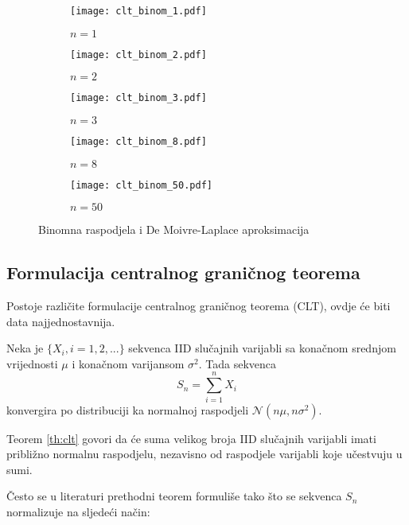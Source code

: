 \begin{figure}[H]
  \centering
  \begin{subfigure}[b]{0.3\textwidth}
    \centering
    \texttt{[image: clt\_binom\_1.pdf]}
    \caption{$n=1$}
    \label{fig:binom:a}
  \end{subfigure}
  \vspace{10pt}
	\begin{subfigure}[b]{0.3\textwidth}
		\centering
    \texttt{[image: clt\_binom\_2.pdf]}
    \caption{$n=2$}
    \label{fig:binom:b}
	\end{subfigure}
	\begin{subfigure}[b]{0.3\textwidth}
		\centering
    \texttt{[image: clt\_binom\_3.pdf]}
    \caption{$n=3$}
    \label{fig:binom:c}
	\end{subfigure}
	\begin{subfigure}[b]{0.3\textwidth}
		\centering
    \texttt{[image: clt\_binom\_8.pdf]}
    \caption{$n=8$}
    \label{fig:binom:d}
	\end{subfigure}
	\begin{subfigure}[b]{0.3\textwidth}
		\centering
    \texttt{[image: clt\_binom\_50.pdf]}
    \caption{$n=50$}
    \label{fig:binom:e}
	\end{subfigure}
	\caption{Binomna raspodjela i De Moivre-Laplace aproksimacija}
  \label{fig:binom}
\end{figure}

\subsection{Formulacija centralnog graničnog teorema}

Postoje različite formulacije centralnog graničnog teorema (CLT), ovdje će biti
data najjednostavnija.

\begin{theorem} \label{th:clt}
  Neka je $\{X_i, i=1,2,...\}$ sekvenca IID slučajnih varijabli sa
  konačnom srednjom vrijednosti $\mu$ i konačnom varijansom $\sigma^2$. Tada
  sekvenca $$S_n = \sum_{i=1}^{n} X_i$$ konvergira po distribuciji ka normalnoj
  raspodjeli $\mathcal{N}(n\mu, n\sigma^2)$.
\end{theorem}

Teorem \ref{th:clt} govori da će suma velikog broja IID slučajnih varijabli
imati približno normalnu raspodjelu, nezavisno od raspodjele varijabli koje
učestvuju u sumi.

Često se u literaturi prethodni teorem formuliše tako što se sekvenca $S_n$
normalizuje na sljedeći način:

